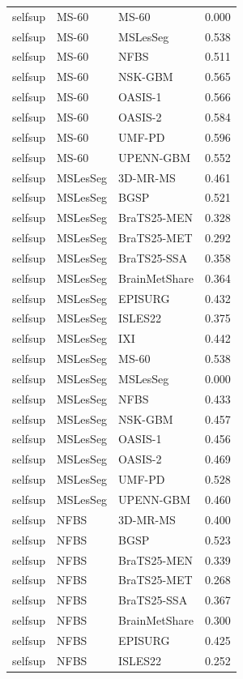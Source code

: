 \begin{tabular}{lllr}
selfsup & MS-60 & MS-60 & 0.000 \\
selfsup & MS-60 & MSLesSeg & 0.538 \\
selfsup & MS-60 & NFBS & 0.511 \\
selfsup & MS-60 & NSK-GBM & 0.565 \\
selfsup & MS-60 & OASIS-1 & 0.566 \\
selfsup & MS-60 & OASIS-2 & 0.584 \\
selfsup & MS-60 & UMF-PD & 0.596 \\
selfsup & MS-60 & UPENN-GBM & 0.552 \\
selfsup & MSLesSeg & 3D-MR-MS & 0.461 \\
selfsup & MSLesSeg & BGSP & 0.521 \\
selfsup & MSLesSeg & BraTS25-MEN & 0.328 \\
selfsup & MSLesSeg & BraTS25-MET & 0.292 \\
selfsup & MSLesSeg & BraTS25-SSA & 0.358 \\
selfsup & MSLesSeg & BrainMetShare & 0.364 \\
selfsup & MSLesSeg & EPISURG & 0.432 \\
selfsup & MSLesSeg & ISLES22 & 0.375 \\
selfsup & MSLesSeg & IXI & 0.442 \\
selfsup & MSLesSeg & MS-60 & 0.538 \\
selfsup & MSLesSeg & MSLesSeg & 0.000 \\
selfsup & MSLesSeg & NFBS & 0.433 \\
selfsup & MSLesSeg & NSK-GBM & 0.457 \\
selfsup & MSLesSeg & OASIS-1 & 0.456 \\
selfsup & MSLesSeg & OASIS-2 & 0.469 \\
selfsup & MSLesSeg & UMF-PD & 0.528 \\
selfsup & MSLesSeg & UPENN-GBM & 0.460 \\
selfsup & NFBS & 3D-MR-MS & 0.400 \\
selfsup & NFBS & BGSP & 0.523 \\
selfsup & NFBS & BraTS25-MEN & 0.339 \\
selfsup & NFBS & BraTS25-MET & 0.268 \\
selfsup & NFBS & BraTS25-SSA & 0.367 \\
selfsup & NFBS & BrainMetShare & 0.300 \\
selfsup & NFBS & EPISURG & 0.425 \\
selfsup & NFBS & ISLES22 & 0.252 \\

\end{tabular}
